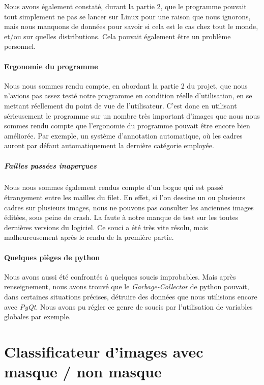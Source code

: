 \documentclass{rapport}
\begin{document}
    
        Nous avons également constaté, durant la partie 2, que le programme pouvait tout simplement ne pas se lancer sur Linux pour une raison que nous ignorons, mais nous manquons de données pour savoir si cela est le cas chez tout le monde, et/ou sur quelles distributions. Cela pouvait également être un problème personnel.

        \subsection{Ergonomie du programme}
        Nous nous sommes rendu compte, en abordant la partie 2 du projet, que nous n'avions pas assez testé notre programme en condition réelle d'utilisation, en se mettant réellement du point de vue de l'utilisateur. C'est donc en utilisant sérieusement le programme sur un nombre très important d'images que nous nous sommes rendu compte que l'ergonomie du programme pouvait être encore bien améliorée. Par exemple, un système d'annotation automatique, où les cadres auront par défaut automatiquement la dernière catégorie employée.

        \subsubsection{Failles passées inaperçues}
        Nous nous sommes également rendus compte d'un bogue qui est passé étrangement entre les mailles du filet.
        En effet, si l'on dessine un ou plusieurs cadres sur plusieurs images, nous ne pouvons pas consulter les anciennes images éditées, sous peine de crash. La faute à notre manque de test sur les toutes dernières versions du logiciel. Ce souci a été très vite résolu, mais malheureusement après le rendu de la première partie.

        \subsection{Quelques pièges de python}
        Nous avons aussi été confrontés à quelques soucis improbables. Mais après renseignement, nous avons trouvé que le \textit{Garbage-Collector} de python pouvait, dans certaines situations précises, détruire des données que nous utilisions encore avec \textit{PyQt}. Nous avons pu régler ce genre de soucis par l'utilisation de variables globales par exemple.

    \clearpage
\part{Classificateur d'images avec masque / non masque}
\end{document}
